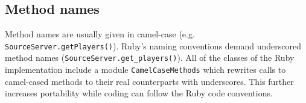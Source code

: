 \subsection{Method names}
Method names are usually given in camel-case (e.g.
\lstinline{SourceServer.getPlayers()}). Ruby's naming conventions demand
underscored method names (\lstinline{SourceServer.get_players()}). All of the
classes of the Ruby implementation include a module
\lstinline{CamelCaseMethods} which rewrites calls to camel-cased methods to
their real counterparts with underscores. This further increases portability
while coding can follow the Ruby code conventions.

